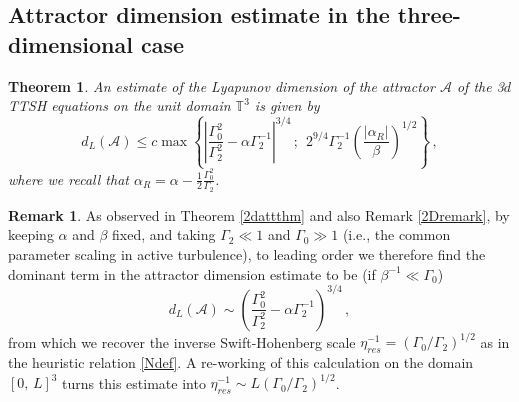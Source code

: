 \documentclass[11pt]{amsart}
\newcommand{\Rb}{\beta}
\newcommand{\Att}{\mathcal{A}}
\newcommand{\Gamzero}{\Gamma_{0}}
\newcommand{\Gamtwo}{\Gamma_{2}}
\newtheorem{theorem}[proposition]{Theorem}
\theoremstyle{definition}
\newtheorem{remark}[proposition]{Remark}
\numberwithin{equation}{section}
\numberwithin{equation}{section}
\begin{document}
\subsection{Attractor dimension estimate in the three-dimensional case}\label{3datt}

\begin{theorem}\label{3dattthm}
An estimate of the Lyapunov dimension of the attractor $\mathcal{A}$ of the 3$d$ TTSH equations on the unit domain $\mathbb{T}^3$ is given by
\begin{equation*} \label{3dest}
d_L (\Att) \leq c \max \left\{\left\lvert\frac{\Gamzero^2}{\Gamtwo^{2}} - \alpha \Gamtwo^{-1} \right\rvert^{3/4}\,;~~
2^{9/4}\Gamtwo^{-1}\left(\frac{|\alpha_{R}|}{\Rb}\right)^{1/2}\right\}\,,
\end{equation*}
where we recall that $\alpha_{R} = \alpha - \frac{1}{2} \frac{\Gamzero^2}{\Gamtwo}$.
\end{theorem}
\par\vspace{-5mm}\noindent
\begin{remark} \label{3Dremark}
As observed in Theorem \ref{2dattthm} and also Remark \ref{2Dremark}, by keeping $\alpha$ and $\Rb$ fixed, and taking $\Gamtwo \ll 1$ and $\Gamzero \gg 1$ (i.e., the common parameter scaling in active turbulence), to leading order we therefore find the dominant term in the attractor dimension estimate to be (if $\Rb^{-1} \ll \Gamzero$)
\begin{equation}
d_L (\Att) \sim \left(\frac{\Gamzero^2}{\Gamtwo^{2}} -\alpha\Gamtwo^{-1}\right)^{3/4}\,,
\end{equation}
from which we recover the inverse Swift-Hohenberg scale $\eta_{res}^{-1} = (\Gamzero/\Gamtwo)^{1/2}$ as in the heuristic relation \eqref{Ndef}. A re-working of this calculation on the domain $[0,\,L]^3$ turns this estimate into $\eta_{res}^{-1}\sim L(\Gamzero/\Gamtwo)^{1/2}$.
\end{remark}
\par\smallskip\noindent
\end{document}
